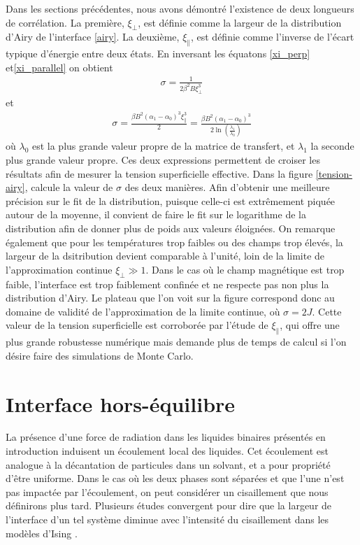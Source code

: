 Dans les sections précédentes, nous avons démontré l'existence de deux longueurs de corrélation. La première, $\xi_\perp$, est définie comme la largeur de la distribution d'Airy de l'interface \ref{airy}. La deuxième, $\xi_\parallel$, est définie comme l'inverse de l'écart typique d'énergie entre deux états. En inversant les équatons \ref{xi_perp} et\ref{xi_parallel} on obtient
\begin{align}
    \sigma = \frac{1}{2 \beta^2 B \xi_\perp^3}
\end{align}
et 
\begin{align}
    \sigma = \frac{\beta B^2 (\alpha_1-\alpha_0)^3 \xi_\parallel^3}{2} =  \frac{\beta B^2 (\alpha_1-\alpha_0)^3 }{2 \ln \left(\frac{\lambda_1}{\lambda_0} \right)} 
\end{align}
où $\lambda_0$ est la plus grande valeur propre de la matrice de transfert, et $\lambda_1$ la seconde plus grande valeur propre. Ces deux expressions permettent de croiser les résultats afin de mesurer la tension superficielle effective. Dans la figure \ref{tension-airy}, calcule la valeur de $\sigma$ des deux manières. 
Afin d'obtenir une meilleure précision sur le fit de la distribution, puisque celle-ci est extrêmement piquée autour de la moyenne, il convient de faire le fit sur le logarithme de la distribution afin de donner plus de poids aux valeurs éloignées. On remarque également que pour les températures trop faibles ou des champs trop élevés, la largeur de la dsitribution devient comparable à l'unité, loin de la limite de l'approximation continue $\xi_\perp \gg 1$. Dans le cas où le champ magnétique est trop faible, l'interface est trop faiblement confinée et ne respecte pas non plus la distribution d'Airy. Le plateau que l'on voit sur la figure correspond donc au domaine de validité de l'approximation de la limite continue, où $\sigma = 2 J$. 
Cette valeur de la tension superficielle est corroborée par l'étude de $\xi_\parallel$, qui offre une plus grande robustesse numérique mais demande plus de temps de calcul si l'on désire faire des simulations de Monte Carlo. 

    \section{Interface hors-équilibre}

La présence d'une force de radiation dans les liquides binaires présentés en introduction induisent un écoulement local des liquides. Cet écoulement est analogue à la décantation de particules dans un solvant, et a pour propriété d'être uniforme. Dans le cas où les deux phases sont séparées et que l'une n'est pas impactée par l'écoulement, on peut considérer un cisaillement que nous définirons plus tard.
Plusieurs études convergent pour dire que la largeur de l'interface d'un tel système diminue avec l'intensité du cisaillement dans les modèles d'Ising \cite{smith_interfaces_2008,smith_interfaces_2008-1}.

